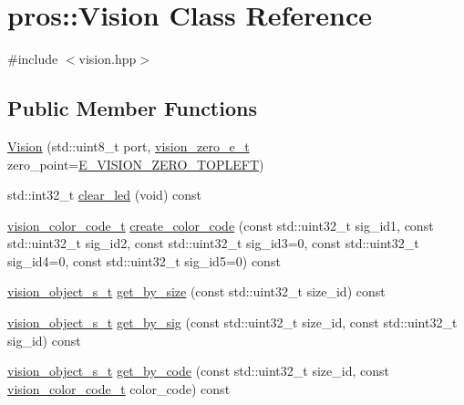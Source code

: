 \hypertarget{classpros_1_1Vision}{}\section{pros\+:\+:Vision Class Reference}
\label{classpros_1_1Vision}


{\ttfamily \#include $<$vision.\+hpp$>$}

\subsection*{Public Member Functions}
\begin{DoxyCompactItemize}
\item 
\hyperlink{classpros_1_1Vision_a46cdaf74713f630b5bb5f4d0d3259dcd}{Vision} (std\+::uint8\+\_\+t port, \hyperlink{vision_8h_a2e8bc1c48f8aab12275bfc1868fbbad6}{vision\+\_\+zero\+\_\+e\+\_\+t} zero\+\_\+point=\hyperlink{vision_8h_aef7c8269b3fb0dfbf4e597b2d8dd7af5a0ff244c5f3e9771f962986e25b00ff3d}{E\+\_\+\+V\+I\+S\+I\+O\+N\+\_\+\+Z\+E\+R\+O\+\_\+\+T\+O\+P\+L\+E\+FT})
\item 
std\+::int32\+\_\+t \hyperlink{classpros_1_1Vision_a00f02cfb09ca224c2a7735be918e941d}{clear\+\_\+led} (void) const
\item 
\hyperlink{vision_8h_a71f2011a47e95558bb534b05c16c7f2b}{vision\+\_\+color\+\_\+code\+\_\+t} \hyperlink{classpros_1_1Vision_ab50bcfb700b591e2f1654962baac400f}{create\+\_\+color\+\_\+code} (const std\+::uint32\+\_\+t sig\+\_\+id1, const std\+::uint32\+\_\+t sig\+\_\+id2, const std\+::uint32\+\_\+t sig\+\_\+id3=0, const std\+::uint32\+\_\+t sig\+\_\+id4=0, const std\+::uint32\+\_\+t sig\+\_\+id5=0) const
\item 
\hyperlink{vision_8h_ae619120558539c13e53b5a6f42fb4375}{vision\+\_\+object\+\_\+s\+\_\+t} \hyperlink{classpros_1_1Vision_aa5cca450a5b80278a97bbea786195733}{get\+\_\+by\+\_\+size} (const std\+::uint32\+\_\+t size\+\_\+id) const
\item 
\hyperlink{vision_8h_ae619120558539c13e53b5a6f42fb4375}{vision\+\_\+object\+\_\+s\+\_\+t} \hyperlink{classpros_1_1Vision_a10fd89ed3c5e8fe5ce25046a877c7d84}{get\+\_\+by\+\_\+sig} (const std\+::uint32\+\_\+t size\+\_\+id, const std\+::uint32\+\_\+t sig\+\_\+id) const
\item 
\hyperlink{vision_8h_ae619120558539c13e53b5a6f42fb4375}{vision\+\_\+object\+\_\+s\+\_\+t} \hyperlink{classpros_1_1Vision_a4b96f92a2ae2f29fd37709958f48e514}{get\+\_\+by\+\_\+code} (const std\+::uint32\+\_\+t size\+\_\+id, const \hyperlink{vision_8h_a71f2011a47e95558bb534b05c16c7f2b}{vision\+\_\+color\+\_\+code\+\_\+t} color\+\_\+code) const

\end{DoxyCompactItemize}
